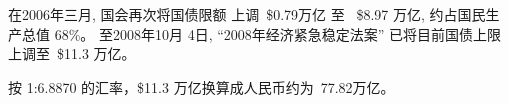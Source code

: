 \documentclass{article}
\begin{document}
\begin{CJK*}{UTF8}{gbsn}


在2006年三月, 国会再次将国债限额 
上调\  \$0.79万亿 至 \ \$8.97 万亿,
约占国民生产总值 68\%。 至2008年10月
4日, ``2008年经济紧急稳定法案'' 
已将目前国债上限上调至\ \$11.3 万亿。

按 1:6.8870 的汇率，\$11.3 万亿换算成人民币约为\ \textyen77.82万亿。

\clearpage\end{CJK*}
\end{document}

